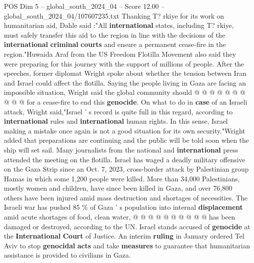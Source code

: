 \begin{textsample}{POS Dim 5 – global\_south\_2024\_04 – Score 12.00 – global\_south\_2024\_04/107607235.txt}
Thanking T? rkiye for its work on humanitarian aid, Dahle said :"All \textbf{international} states, including T? rkiye, must safely transfer this aid to the region in line with the decisions of the \textbf{international} \textbf{criminal} \textbf{courts} and ensure a permanent cease-fire in the region."Huwaida Araf from the US Freedom Flotilla Movement also said they were preparing for this journey with the support of millions of people.
After the speeches, former diplomat Wright spoke about whether the tension between Iran and Israel could affect the flotilla.
Saying the people living in Gaza are facing an impossible situation, Wright said the global community should @ @ @ @ @ @ @ @ @ @ for a cease-fire to end this \textbf{genocide}.
On what to do in \textbf{case} of an Israeli attack, Wright said,"Israel ' s record is quite full in this regard, according to \textbf{international} rules and \textbf{international} human rights.
In this sense, Israel making a mistake once again is not a good situation for its own security."Wright added that preparations are continuing and the public will be told soon when the ship will set sail.
Many journalists from the national and \textbf{international} press attended the meeting on the flotilla.
Israel has waged a deadly military offensive on the Gaza Strip since an Oct. 7, 2023, cross-border attack by Palestinian group Hamas in which some 1,200 people were killed.
More than 34,000 Palestinians, mostly women and children, have since been killed in Gaza, and over 76,800 others have been injured amid mass destruction and shortages of necessities.
The Israeli war has pushed 85 \% of Gaza ' s population into internal \textbf{displacement} amid acute shortages of food, clean water, @ @ @ @ @ @ @ @ @ @ has been damaged or destroyed, according to the UN.
Israel stands accused of \textbf{genocide} at the \textbf{International} \textbf{Court} of Justice.
An interim \textbf{ruling} in January ordered Tel Aviv to stop \textbf{genocidal} \textbf{acts} and take \textbf{measures} to guarantee that humanitarian assistance is provided to civilians in Gaza.

\end{textsample}
